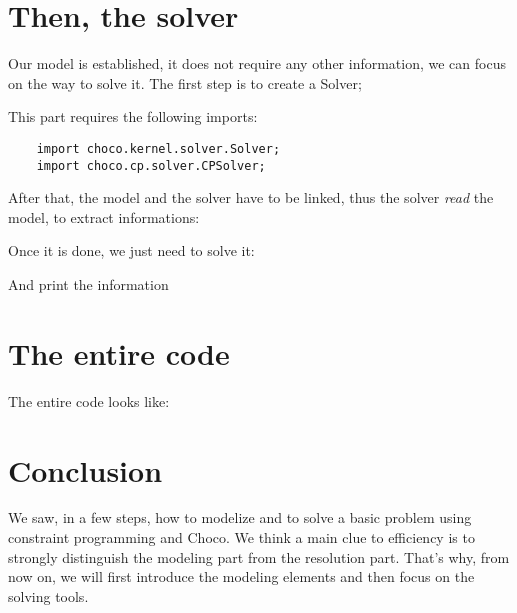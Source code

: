 \section{Then, the solver}\label{gettingstarted:then,thesolver}\hypertarget{gettingstarted:then,thesolver}{}
Our model is established, it does not require any other information, we can focus on the way to solve it.
The first step is to create a Solver;

This part requires the following imports:
\begin{lstlisting}
	import choco.kernel.solver.Solver;
	import choco.cp.solver.CPSolver;
\end{lstlisting}

After that, the model and the solver have to be linked, thus the solver \emph{read} the model, to extract informations:


Once it is done, we just need to solve it:

And print the information


\section{The entire code}\label{gettingstarted:thecode}\hypertarget{gettingstarted:thecode}{}
The entire code looks like:
\newpage


\section{Conclusion}\label{gettingstarted:conclusion}\hypertarget{gettingstarted:conclusion}{}
We saw, in a few steps, how to modelize and to solve a basic problem using constraint programming and Choco.
We think a main clue to efficiency is to strongly distinguish the modeling part from the resolution part. 
That's why, from now on, we will first introduce the modeling elements and then focus on the solving tools.   
